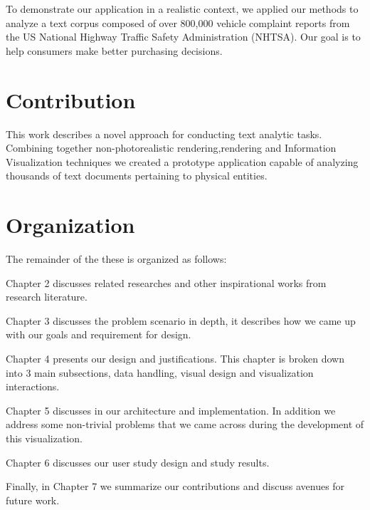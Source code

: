  To demonstrate our application in a realistic context, we applied our methods
 to analyze a text corpus composed of over 800,000 vehicle complaint reports
 from the US National Highway Traffic Safety Administration (NHTSA). Our goal is
 to help consumers make better purchasing decisions.
 
 
 \section{Contribution}
 This work describes a novel approach for conducting text analytic tasks.
 Combining together non-photorealistic rendering,\threed rendering and
 Information Visualization techniques we created a prototype application capable
 of analyzing thousands of text documents pertaining to physical entities.
 

 
 \section{Organization}
 The remainder of the these is organized as follows:
 
 \noindent Chapter 2 discusses related researches and other inspirational works
 from research literature.
 
 \noindent Chapter 3 discusses the problem scenario in depth, it describes how
 we came up with our goals and requirement for design.
 
 \noindent Chapter 4 presents our design and justifications. This chapter is
 broken down into 3 main subsections, data handling, visual design and
 visualization interactions.
 
 \noindent Chapter 5 discusses in our architecture and implementation. In
 addition we address some non-trivial problems that we came across during the
 development of this visualization.
 
 \noindent Chapter 6 discusses our user study design and study results. 
 
 \noindent Finally, in Chapter 7 we summarize our contributions and discuss
 avenues for future work. 
  
 
  